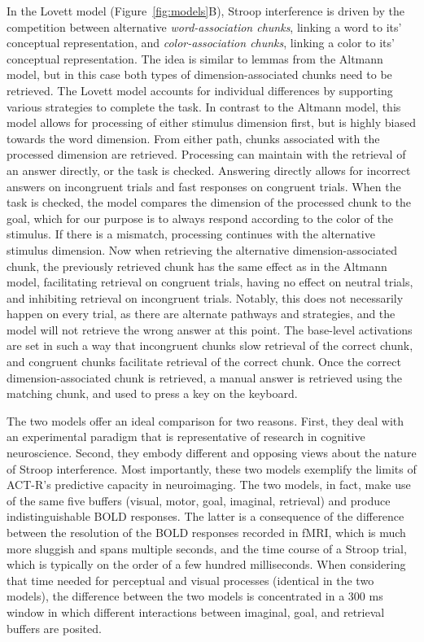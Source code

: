 \documentclass[10pt,letterpaper]{article}
\begin{document}
In the Lovett model (Figure~\ref{fig:models}B), Stroop interference is driven by the competition between alternative \textit{word-association chunks}, linking a word to its' conceptual representation, and \textit{color-association chunks}, linking a color to its' conceptual representation. The idea is similar to lemmas from the Altmann model, but in this case both types of dimension-associated chunks need to be retrieved. The Lovett model accounts for individual differences by supporting various strategies to complete the task. In contrast to the Altmann model, this model allows for processing of either stimulus dimension first, but is highly biased towards the word dimension. From either path, chunks associated with the processed dimension are retrieved. Processing can maintain with the retrieval of an answer directly, or the task is checked. Answering directly allows for incorrect answers on incongruent trials and fast responses on congruent trials. When the task is checked, the model compares the dimension of the processed chunk to the goal, which for our purpose is to always respond according to the color of the stimulus. If there is a mismatch, processing continues with the alternative stimulus dimension. Now when retrieving the alternative dimension-associated chunk, the previously retrieved chunk has the same effect as in the Altmann model, facilitating retrieval on congruent trials, having no effect on neutral trials, and inhibiting retrieval on incongruent trials. Notably, this does not necessarily happen on every trial, as there are alternate pathways and strategies, and the model will not retrieve the wrong answer at this point. The base-level activations are set in such a way that incongruent chunks slow retrieval of the correct chunk, and congruent chunks facilitate retrieval of the correct chunk. Once the correct dimension-associated chunk is retrieved, a manual answer is retrieved using the matching chunk, and used to press a key on the keyboard. 

The two models offer an ideal comparison for two reasons. First, they deal with an experimental paradigm that is representative of research in cognitive neuroscience. Second, they embody different and opposing views about the nature of Stroop interference. Most importantly, these two models exemplify the limits of ACT-R's predictive capacity in neuroimaging. The two models, in fact, make use of the same five buffers (visual, motor, goal, imaginal, retrieval) and produce indistinguishable BOLD responses. The latter is a consequence of the difference between the resolution of the BOLD responses recorded in fMRI, which is much more sluggish and spans multiple seconds, and the time course of a Stroop trial, which is typically on the order of a few hundred milliseconds. When considering that time needed for perceptual and visual processes (identical in the two models), the difference between the two models is concentrated in a 300 ms window in which different interactions between imaginal, goal, and retrieval buffers are posited.
\end{document}
